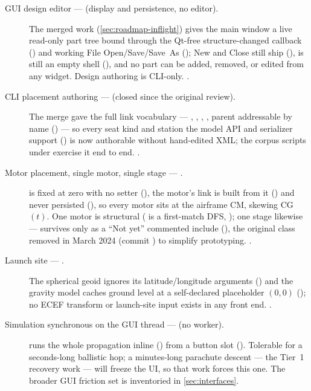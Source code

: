\begin{description}

  \item[GUI design editor --- \fpartial{} (display and persistence, no editor).] The merged
   work (\cref{sec:roadmap-inflight}) gives the main window a
  live read-only part tree bound through the Qt-free structure-changed callback
  () and working File Open/Save/Save~As
  (); New and Close still ship 
  (),  is still an empty shell
  (), and no part can be added, removed, or edited from any
  widget. Design authoring is CLI-only. .

  \item[CLI placement authoring --- \fpresent{} (closed since the original review).] The
   merge gave  the full link vocabulary --- ,
  , , , parent addressable by name
  () --- so every seat kind and station the model API and serializer
  support () is now authorable without hand-edited 
  XML; the corpus scripts under  exercise it end to end.
  .

  \item[Motor placement, single motor, single stage --- \fpartial.]  is fixed
  at zero with no setter (), the motor's link is built from it
  () and never persisted (),
  so every motor sits at the airframe CM, skewing CG$(t)$. One motor is structural
  ( is a first-match DFS, ); one stage
  likewise ---  survives only as a ``Not yet'' commented include
  (), the original class removed in March 2024 (commit
  ) to simplify prototyping. .

  \item[Launch site --- \fabsent.] The spherical geoid ignores its latitude/longitude arguments
  () and the gravity model caches ground level at a
  self-declared placeholder $(0,0)$ (); no ECEF transform
  or launch-site input exists in any front end. .

  \item[Simulation synchronous on the GUI thread --- \fabsent{} (no worker).]
   runs the whole propagation inline () from a button
  slot (). Tolerable for a seconds-long ballistic hop; a
  minutes-long parachute descent --- the Tier~1 recovery work --- will freeze the UI, so that work
  forces this one. The broader GUI friction set is inventoried in \cref{sec:interfaces}.

\end{description}

